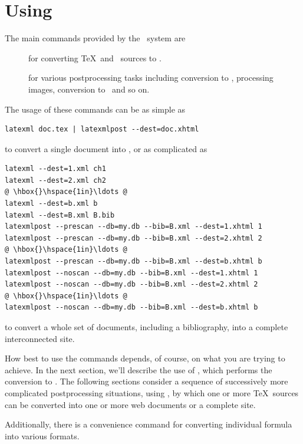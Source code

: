 \documentclass{book}
\begin{document}
\chapter{Using \LaTeXML}\label{usage}
The main commands provided by the \LaTeXML\ system are
\begin{description}
\item[] for converting \TeX\ and \BibTeX\ sources to \XML.
\item[] for various postprocessing tasks including
conversion to \HTML, processing images, conversion to \MathML\ and so on.
\end{description}
\noindent The usage of these commands can be as simple as
\begin{lstlisting}[style=shell]
latexml doc.tex | latexmlpost --dest=doc.xhtml
\end{lstlisting}
\noindent to convert a single document into \XHTML,  or as complicated as
\begin{lstlisting}[style=shell]
latexml --dest=1.xml ch1
latexml --dest=2.xml ch2
@ \hbox{}\hspace{1in}\ldots @
latexml --dest=b.xml b
latexml --dest=B.xml B.bib
latexmlpost --prescan --db=my.db --bib=B.xml --dest=1.xhtml 1
latexmlpost --prescan --db=my.db --bib=B.xml --dest=2.xhtml 2
@ \hbox{}\hspace{1in}\ldots @
latexmlpost --prescan --db=my.db --bib=B.xml --dest=b.xhtml b
latexmlpost --noscan --db=my.db --bib=B.xml --dest=1.xhtml 1
latexmlpost --noscan --db=my.db --bib=B.xml --dest=2.xhtml 2
@ \hbox{}\hspace{1in}\ldots @
latexmlpost --noscan --db=my.db --bib=B.xml --dest=b.xhtml b
\end{lstlisting}
\noindent to convert a whole set of documents, including a bibliography,
into a complete interconnected site.

How best to use the commands depends, of course, on what you
are trying to achieve.  In the next section, we'll describe
the use of , which performs the conversion to \XML.
The following sections consider a sequence of
successively more complicated postprocessing situations,
using ,
by which one or more \TeX\ sources can be converted into
one or more web documents or a complete site.

Additionally, there is a convenience command 
for converting individual formula into various formats.
\end{document}
